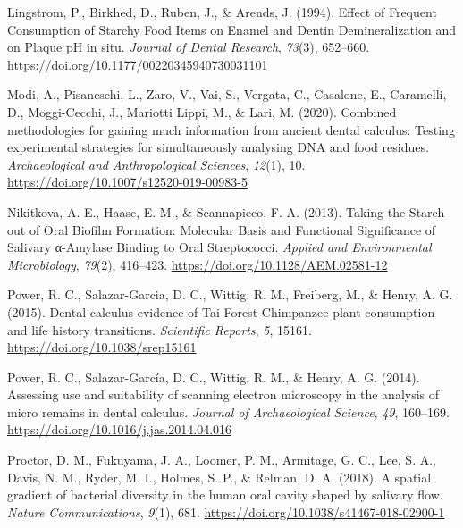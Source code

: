 \documentclass[
  letterpaper,
]{book}
\newlength{\cslhangindent}
\newlength{\cslentryspacingunit} %
\newenvironment{CSLReferences}[2] %
 {%
  \setlength{\parindent}{0pt}
  \ifodd #1
  \let\oldpar\par
  \def\par{\hangindent=\cslhangindent\oldpar}
  \fi
  \setlength{\parskip}{#2\cslentryspacingunit}
 }%
 {}
\begin{document}
\begin{CSLReferences}{1}{0}
\leavevmode{}%
Lingstrom, P., Birkhed, D., Ruben, J., \& Arends, J. (1994). Effect of
{Frequent Consumption} of {Starchy Food Items} on {Enamel} and {Dentin
Demineralization} and on {Plaque pH} in situ. \emph{Journal of Dental
Research}, \emph{73}(3), 652--660.
\url{https://doi.org/10.1177/00220345940730031101}

\leavevmode{}%
Modi, A., Pisaneschi, L., Zaro, V., Vai, S., Vergata, C., Casalone, E.,
Caramelli, D., Moggi-Cecchi, J., Mariotti Lippi, M., \& Lari, M. (2020).
Combined methodologies for gaining much information from ancient dental
calculus: Testing experimental strategies for simultaneously analysing
{DNA} and food residues. \emph{Archaeological and Anthropological
Sciences}, \emph{12}(1), 10.
\url{https://doi.org/10.1007/s12520-019-00983-5}

\leavevmode{}%
Nikitkova, A. E., Haase, E. M., \& Scannapieco, F. A. (2013). Taking the
{Starch} out of {Oral Biofilm Formation}: {Molecular Basis} and
{Functional Significance} of {Salivary} α-{Amylase Binding} to {Oral
Streptococci}. \emph{Applied and Environmental Microbiology},
\emph{79}(2), 416--423. \url{https://doi.org/10.1128/AEM.02581-12}

\leavevmode{}%
Power, R. C., Salazar-Garcia, D. C., Wittig, R. M., Freiberg, M., \&
Henry, A. G. (2015). Dental calculus evidence of {Tai Forest Chimpanzee}
plant consumption and life history transitions. \emph{Scientific
Reports}, \emph{5}, 15161. \url{https://doi.org/10.1038/srep15161}

\leavevmode{}%
Power, R. C., Salazar-García, D. C., Wittig, R. M., \& Henry, A. G.
(2014). Assessing use and suitability of scanning electron microscopy in
the analysis of micro remains in dental calculus. \emph{Journal of
Archaeological Science}, \emph{49}, 160--169.
\url{https://doi.org/10.1016/j.jas.2014.04.016}

\leavevmode{}%
Proctor, D. M., Fukuyama, J. A., Loomer, P. M., Armitage, G. C., Lee, S.
A., Davis, N. M., Ryder, M. I., Holmes, S. P., \& Relman, D. A. (2018).
A spatial gradient of bacterial diversity in the human oral cavity
shaped by salivary flow. \emph{Nature Communications}, \emph{9}(1), 681.
\url{https://doi.org/10.1038/s41467-018-02900-1}


\end{CSLReferences}
\end{document}
